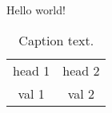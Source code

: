 \documentclass{article}
\begin{document}
Hello world!

\begin{table}
    \centering
    \begin{tabular}{cc}
        head 1 & head 2 \\
        val 1 & val 2 
    \end{tabular}
    \caption{Caption text.
    \label{tab1}
    }
\end{table}
\end{document}
